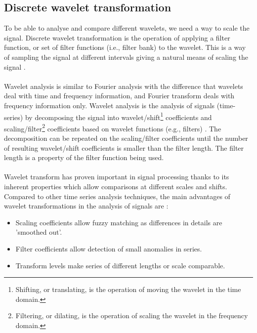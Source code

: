 \subsection{Discrete wavelet transformation}
To be able to analyse and compare different wavelets, we need a way to scale
the signal. Discrete wavelet transformation is the operation of applying a
filter function, or set of filter functions (i.e., filter bank) to the wavelet.
This is a way of sampling the signal at different intervals giving a natural
means of scaling the signal \cite{karus2013}.

\paragraph{}
Wavelet analysis is similar to Fourier analysis with the difference that
wavelets deal with time and frequency information, and Fourier transform deals
with frequency information only. Wavelet analysis is the analysis of signals
(time-series) by decomposing the signal into wavelet/shift\footnote{Shifting,
or translating, is the operation of moving the wavelet in the time domain.}
coefficients and scaling/filter\footnote{Filtering, or dilating, is the
operation of scaling the wavelet in the frequency domain.} coefficients based
on wavelet functions (e.g., filters) \cite{karus2013}. The decomposition can be
repeated on the scaling/filter coefficients until the number of resulting
wavelet/shift coefficients is smaller than the filter length. The filter length
is a property of the filter function being used.

\paragraph{}
Wavelet transform has proven important in signal processing thanks to its
inherent properties which allow comparisons at different scales and shifts.
Compared to other time series analysis techniques, the main advantages of
wavelet transformations in the analysis of signals are \cite{karus2013}:
\begin{itemize}
	\item Scaling coefficients allow fuzzy matching as differences in details are
	'smoothed out'.
	\item Filter coefficients allow detection of small anomalies in series.
	\item Transform levels make series of different lengths or scale comparable.
\end{itemize}

